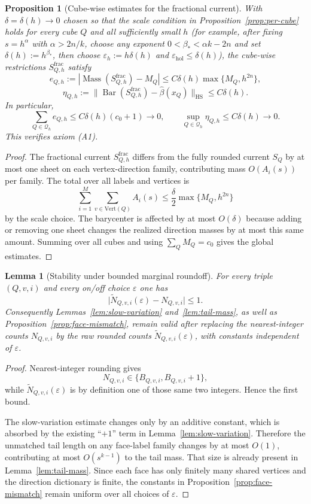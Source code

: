 \documentclass[11pt]{article}
\numberwithin{equation}{section}
\theoremstyle{plain}
\newtheorem{proposition}[theorem]{Proposition}
\newtheorem{lemma}[theorem]{Lemma}
\theoremstyle{definition}
\theoremstyle{remark}
\DeclareMathOperator{\Mass}{Mass}
\DeclareMathOperator{\HS}{HS}
\newcommand{\eps}{\varepsilon}
\newcommand{\calQ}{\mathcal{Q}}
\newcommand{\Bary}{\operatorname{Bar}}
\begin{document}
\begin{proposition}[Cube-wise estimates for the fractional current]\label{prop:cube-estimates}
With $\delta=\delta(h)\to 0$ chosen so that the scale condition in Proposition~\ref{prop:per-cube} holds for every cube $Q$ and all sufficiently small $h$ (for example, after fixing $s=h^\alpha$ with $\alpha>2n/k$, choose any exponent $0<\beta_\ast<\alpha k-2n$ and set $\delta(h):=h^{\beta_\ast}$, then choose $\eps_h:=h\delta(h)$ and $\eps_{\mathrm{hol}}\le \delta(h)$), the cube-wise restrictions $S_{Q,h}^{\mathrm{frac}}$ satisfy
\[
e_{Q,h}:=|\Mass(S_{Q,h}^{\mathrm{frac}})-M_Q|\le C\delta(h)\max\{M_Q,h^{2n}\},
\]
\[
\eta_{Q,h}:=\|\Bary(S_{Q,h}^{\mathrm{frac}})-\widehat\beta(x_Q)\|_{\HS}\le C\delta(h).
\]
In particular,
\[
\sum_{Q\in\calQ_h} e_{Q,h}\le C\delta(h)(c_0+1)\longrightarrow 0,
\qquad
\sup_{Q\in\calQ_h}\eta_{Q,h}\le C\delta(h)\longrightarrow 0.
\]
This verifies axiom \textnormal{(A1)}.
\end{proposition}

\begin{proof}
The fractional current $S_{Q,h}^{\mathrm{frac}}$ differs from the fully rounded current $S_Q$ by at most one sheet on each vertex-direction family, contributing mass $O(A_i(s))$ per family.  The total over all labels and vertices is
\[
\sum_{i=1}^M\sum_{v\in\mathrm{Vert}(Q)} A_i(s)\le \frac\delta2\max\{M_Q,h^{2n}\}
\]
by the scale choice.  The barycenter is affected by at most $O(\delta)$ because adding or removing one sheet changes the realized direction masses by at most this same amount.  Summing over all cubes and using $\sum_Q M_Q=c_0$ gives the global estimates.
\end{proof}

\begin{lemma}[Stability under bounded marginal roundoff]\label{lem:roundoff-stable}
For every triple $(Q,v,i)$ and every on/off choice $\varepsilon$ one has
\[
\bigl|\widetilde N_{Q,v,i}(\varepsilon)-N_{Q,v,i}\bigr|\le 1.
\]
Consequently Lemmas~\ref{lem:slow-variation} and~\ref{lem:tail-mass}, as well as Proposition~\ref{prop:face-mismatch}, remain valid after replacing the nearest-integer counts $N_{Q,v,i}$ by the raw rounded counts $\widetilde N_{Q,v,i}(\varepsilon)$, with constants independent of $\varepsilon$.
\end{lemma}

\begin{proof}
Nearest-integer rounding gives
\[
N_{Q,v,i}\in\{B_{Q,v,i},B_{Q,v,i}+1\},
\]
while $\widetilde N_{Q,v,i}(\varepsilon)$ is by definition one of those same two integers.  Hence the first bound.

The slow-variation estimate changes only by an additive constant, which is absorbed by the existing ``$+1$'' term in Lemma~\ref{lem:slow-variation}.  Therefore the unmatched tail length on any face-label family changes by at most $O(1)$, contributing at most $O(s^{k-1})$ to the tail mass.  That size is already present in Lemma~\ref{lem:tail-mass}.  Since each face has only finitely many shared vertices and the direction dictionary is finite, the constants in Proposition~\ref{prop:face-mismatch} remain uniform over all choices of $\varepsilon$.
\end{proof}
\end{document}
